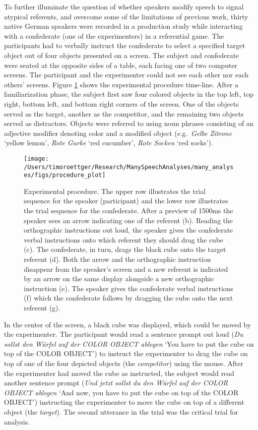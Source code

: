\documentclass[Review,times,sageh]{sagej}
\begin{document}
To further illuminate the question of whether speakers modify speech to signal atypical referents, and overcome some of the limitations of previous work, thirty native German speakers were recorded in a production study while interacting with a confederate (one of the experimenters) in a referential game.
The participants had to verbally instruct the confederate to select a specified target object out of four objects presented on a screen.
The subject and confederate were seated at the opposite sides of a table, each facing one of two computer screens.
The participant and the experimenter could not see each other nor each others' screens.
Figure \ref{fig:procedural} shows the experimental procedure time-line.
After a familiarization phase, the subject first saw four colored objects in the top left, top right, bottom left, and bottom right corners of the screen.
One of the objects served as the target, another as the competitor, and the remaining two objects served as distractors.
Objects were referred to using noun phrases consisting of an adjective modifier denoting color and a modified object (e.g.~\emph{Gelbe Zitrone} `yellow lemon', \emph{Rote Gurke} `red cucumber', \emph{Rote Socken} `red socks').



\begin{figure}
\texttt{[image: /Users/timoroettger/Research/ManySpeechAnalyses/many\_analyses/figs/procedure\_plot]} \caption{Experimental procedure. The upper row illustrates the trial sequence for the speaker (participant) and the lower row illustrates the trial sequence for the confederate. After a preview of 1500ms the speaker sees an arrow indicating one of the referent (b). Reading the orthographic instructions out loud, the speaker gives the confederate verbal instructions onto which referent they should drag the cube (c). The confederate, in turn, drags the black cube onto the target referent (d). Both the arrow and the orthographic instruction disappear from the speaker's screen and a new referent is indicated by an arrow on the same display alongside a new orthographic instruction (e). The speaker gives the confederate verbal instructions (f) which the confederate follows by dragging the cube onto the next referent (g).}\label{fig:procedural}
\end{figure}

In the center of the screen, a black cube was displayed, which could be moved by the experimenter.
The participant would read a sentence prompt out loud (\emph{Du sollst den Würfel auf der COLOR OBJECT ablegen} `You have to put the cube on top of the COLOR OBJECT') to instruct the experimenter to drag the cube on top of one of the four depicted objects (the \emph{competitor}) using the mouse.
After the experimenter had moved the cube as instructed, the subject would read another sentence prompt (\emph{Und jetzt sollst du den Würfel auf der COLOR OBJECT ablegen} `And now, you have to put the cube on top of the COLOR OBJECT') instructing the experimenter to move the cube on top of a different object (the \emph{target}).
The second utterance in the trial was the critical trial for analysis.
\end{document}
